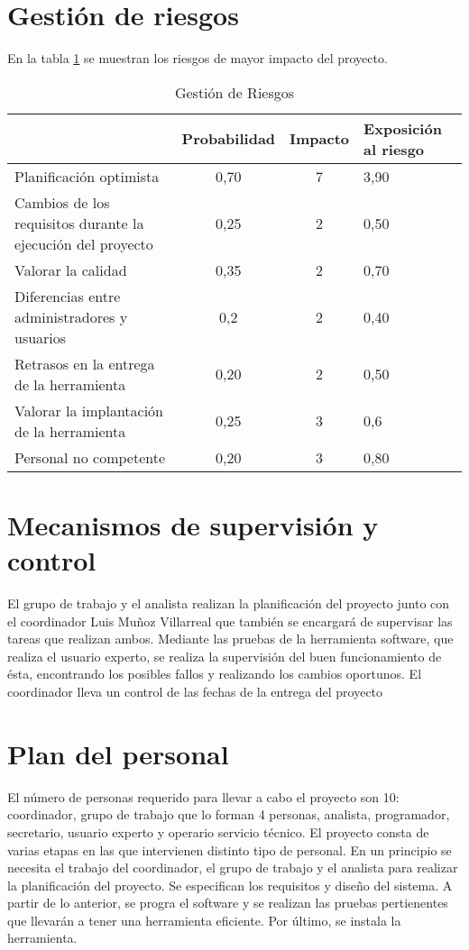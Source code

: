 \documentclass[11pt,a4paper,spanish,twoside]{report}
\begin{document}
\section{Gestión de riesgos}
En la tabla \ref{Tab:GestRi} se muestran los riesgos de mayor impacto del
proyecto. 
\begin{table}[!h]
  \centering
  \begin{tabular}{p{4.5cm}|c|c|b{2cm}<{\centering}}
    & \textbf{Probabilidad} & \textbf{Impacto} & \textbf{Exposición al riesgo}\\
    \hline \hline
    Planificación optimista 
    & 0,70 & 7 & 3,90 \\ \hline
    Cambios de los requisitos durante la ejecución del proyecto 
    & 0,25 & 2 & 0,50 \\ \hline
    Valorar la calidad & 0,35 & 2 & 0,70 \\ \hline
    Diferencias entre administradores y usuarios & 0,2 & 2 & 0,40 \\ \hline
    Retrasos en la entrega de la herramienta & 0,20 & 2 & 0,50 \\ \hline
    Valorar la implantación de la herramienta & 0,25 & 3 & 0,6 \\ \hline
    Personal no competente & 0,20 & 3 & 0,80 \\ \hline
  \end{tabular}
  \caption{Gestión de Riesgos} \label{Tab:GestRi}
\end{table}

\section{Mecanismos de supervisión y control}
El grupo de trabajo y el analista realizan la planificación del proyecto
junto con el coordinador Luis Muñoz Villarreal que también se encargará de
supervisar las tareas que realizan ambos.
Mediante las pruebas de la herramienta software, que realiza el usuario
experto, se realiza la supervisión del buen funcionamiento de ésta,
encontrando los posibles fallos y realizando los cambios oportunos. 
El coordinador lleva un control de las fechas de la entrega del proyecto

\section{Plan del personal}
El número de personas requerido para llevar a cabo el proyecto son 10:
coordinador, grupo de trabajo que lo forman 4 personas, analista,
programador, secretario, usuario experto y operario servicio técnico. 
El proyecto consta de varias etapas en las que intervienen distinto tipo de
personal. En un principio se necesita el trabajo del coordinador, el grupo
de trabajo y el analista para realizar la planificación del proyecto. Se
especifican los requisitos y diseño del sistema. A partir de lo anterior, se
progra el software y se realizan las pruebas pertienentes que llevarán a
tener una herramienta eficiente. Por último, se instala la herramienta.
\end{document}
